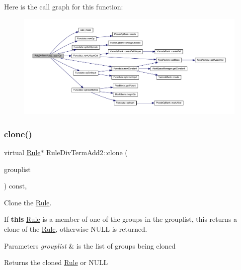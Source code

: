 Here is the call graph for this function\+:
\nopagebreak
\begin{figure}[H]
\begin{center}
\leavevmode
\includegraphics[width=350pt]{class_rule_div_term_add2_abc720625170593b9f1bd43748c2be78c_cgraph}
\end{center}
\end{figure}
\mbox{\label{class_rule_div_term_add2_a96c85869d2834b58cbc49a940eecd53d}} 
\subsubsection{\texorpdfstring{clone()}{clone()}}
{\footnotesize\ttfamily virtual \mbox{\hyperlink{class_rule}{Rule}}$\ast$ Rule\+Div\+Term\+Add2\+::clone (\begin{DoxyParamCaption}\item[{const \mbox{\hyperlink{class_action_group_list}{Action\+Group\+List}} \&}]{grouplist }\end{DoxyParamCaption}) const\hspace{0.3cm}{\ttfamily [inline]}, {\ttfamily [virtual]}}



Clone the \mbox{\hyperlink{class_rule}{Rule}}. 

If {\bfseries{this}} \mbox{\hyperlink{class_rule}{Rule}} is a member of one of the groups in the grouplist, this returns a clone of the \mbox{\hyperlink{class_rule}{Rule}}, otherwise N\+U\+LL is returned. 
\begin{DoxyParams}{Parameters}
{\em grouplist} & is the list of groups being cloned \\
\hline
\end{DoxyParams}
\begin{DoxyReturn}{Returns}
the cloned \mbox{\hyperlink{class_rule}{Rule}} or N\+U\+LL 
\end{DoxyReturn}


